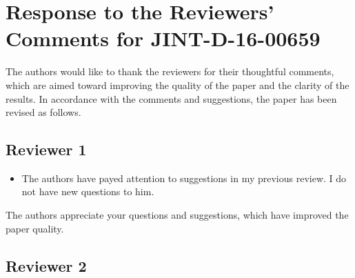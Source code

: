 \documentclass[11pt]{article}
\begin{document}

\section*{Response to the Reviewers' Comments for JINT-D-16-00659}

The authors would like to thank the reviewers for their thoughtful comments, which are aimed toward improving the quality of the paper and the clarity of the results. In accordance with the comments and suggestions, the paper has been revised as follows. 


\subsection*{Reviewer 1}
\begin{itemize}
\item The authors have payed attention to suggestions in my previous review. I do not have new questions to him.
\end{itemize}

The authors appreciate your questions and suggestions, which have improved the paper quality.

\subsection*{Reviewer 2}

\setlength{\leftmargini}{0pt}
\end{document}
